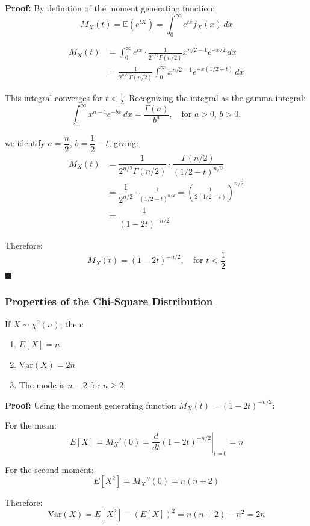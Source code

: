 \documentclass[twoside]{book}
\begin{document}
\textbf{Proof:} By definition of the moment generating function:
\[
M_X(t) = \mathbb{E}\left( e^{tX}\right)  = \int_0^\infty e^{tx} f_X(x) \, dx
\]

\begin{align*}
M_X(t) &= \int_0^\infty e^{tx} \cdot \frac{1}{2^{n/2} \Gamma(n/2)} x^{n/2 - 1} e^{-x/2} \, dx\\
&= \frac{1}{2^{n/2} \Gamma(n/2)} \int_0^\infty x^{n/2 - 1} e^{-x(1/2 - t)} \, dx
\end{align*}


This integral converges for \( t < \frac{1}{2} \). Recognizing the integral as the gamma integral:
\[
\int_0^\infty x^{a - 1} e^{-bx} \, dx = \dfrac{\Gamma(a)}{b^a}, \quad \text{for } a > 0,\, b > 0,
\]

we identify \( a = \dfrac{n}{2} \), \( b = \dfrac{1}{2} - t \), giving:
\begin{align*}
M_X(t) &= \dfrac{1}{2^{n/2} \Gamma(n/2)} \cdot \dfrac{\Gamma(n/2)}{(1/2 - t)^{n/2}}\\
&= \dfrac{1}{2^{n/2}} \cdot \frac{1}{(1/2 - t)^{n/2}} = \left( \frac{1}{2(1/2 - t)} \right)^{n/2}\\
&=\dfrac{1}{(1 - 2t)^{-n/2}}
\end{align*}

Therefore:
\[
M_X(t) = (1 - 2t)^{-n/2}, \quad \text{for } t < \frac{1}{2}
\]
\hfill $\blacksquare$


\subsubsection{Properties of the Chi-Square Distribution}

\begin{textbox}
If $X \sim \chi^2(n)$, then:
\begin{enumerate}
\item $E[X] = n$
\item $\text{Var}(X) = 2n$
\item The mode is $n-2$ for $n \geq 2$
\end{enumerate}
\end{textbox}

\textbf{Proof:} Using the moment generating function $M_X(t) = (1-2t)^{-n/2}$:

For the mean:
$$E[X] = M_X'(0) = \left.\frac{d}{dt}(1-2t)^{-n/2}\right|_{t=0} = n$$

For the second moment:
$$E[X^2] = M_X''(0) = n(n+2)$$

Therefore:
$$\text{Var}(X) = E[X^2] - (E[X])^2 = n(n+2) - n^2 = 2n$$
\end{document}

